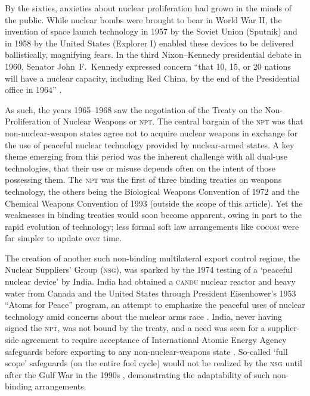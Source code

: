 \documentclass[12pt]{olfmemo}
\begin{document}
By the sixties, anxieties about nuclear proliferation had grown in the minds of the public. While nuclear bombs were brought to bear in World War II, the invention of space launch technology in 1957 by the Soviet Union (Sputnik) and in 1958 by the United States (Explorer I) enabled these devices to be delivered ballistically, magnifying fears. In the third Nixon--Kennedy presidential debate in 1960, Senator John~F.~Kennedy expressed concern ``that 10, 15, or 20 nations will have a nuclear capacity, including Red China, by the end of the Presidential office in 1964'' \citep{NixonKennedy3rd1960}.

As such, the years 1965--1968 saw the negotiation of the Treaty on the Non-Proliferation of Nuclear Weapons or \textsc{npt}. The central bargain of the \textsc{npt} was that non-nuclear-weapon states agree not to acquire nuclear weapons in exchange for the use of peaceful nuclear technology provided by nuclear-armed states. A key theme emerging from this period was the inherent challenge with all dual-use technologies, that their use or misuse depends often on the intent of those possessing them. The \textsc{npt} was the first of three binding treaties on weapons technology, the others being the Biological Weapons Convention of 1972 and the Chemical Weapons Convention of 1993 \citep{Beck2019} (outside the scope of this article). Yet the weaknesses in binding treaties would soon become apparent, owing in part to the rapid evolution of technology; less formal soft law arrangements like \textsc{cocom} were far simpler to update over time.


The creation of another such non-binding multilateral export control regime, the Nuclear Suppliers' Group (\textsc{nsg}), was sparked by the 1974 testing of a `peaceful nuclear device' by India. India had obtained a \textsc{candu} nuclear reactor and heavy water from Canada and the United States through President Eisenhower's 1953 ``Atoms for Peace'' program, an attempt to emphasize the peaceful uses of nuclear technology amid concerns about the nuclear arms race \citep{Walker2001}. India, never having signed the \textsc{npt}, was not bound by the treaty, and a need was seen for a supplier-side agreement to require acceptance of International Atomic Energy Agency safeguards before exporting to any non-nuclear-weapons state \citep{Burr2014}. So-called `full scope' safeguards (on the entire fuel cycle) would not be realized by the \textsc{nsg} until after the Gulf War in the 1990s \citep{Anthony2007}, demonstrating the adaptability of such non-binding arrangements.
\end{document}
